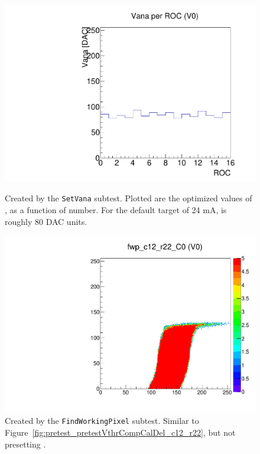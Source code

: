 \begin{figure}[!htp]
\centering
\begin{minipage}{0.45\textwidth}
  \includegraphics[width=1.0\textwidth]{figures/pretest_VanaSettings.pdf}
  \caption{Created by the {\tt SetVana} subtest.  
    Plotted are the optimized values of \vana, as a function of \roc number.
    For the default \iana target of 24 mA, \vana is roughly 80 DAC units.}
  \label{fig:pretest_VanaSettings}
\end{minipage}
\hspace{0.3cm}
\begin{minipage}{0.45\textwidth}
  \includegraphics[width=1.0\textwidth]{figures/pretest_fwp_c12_r22.pdf}
  \caption{Created by the {\tt FindWorkingPixel} subtest.
  Similar to Figure~\ref{fig:pretest_pretestVthrCompCalDel_c12_r22},
  but not presetting \vcal.}
  \label{fig:pretest_fwp_c12_r22}
\end{minipage}
\end{figure}

